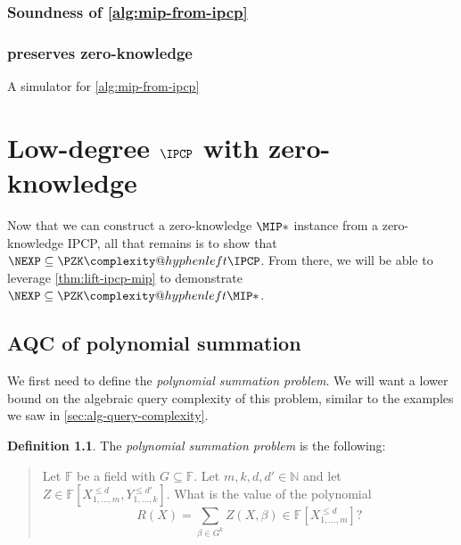 \documentclass[english,12pt]{reedthesis}
\makeatletter
\theoremstyle{plain}
\theoremstyle{definition}
\newtheorem{defn}[defn]{Definition}
\theoremstyle{remark}
\newcommand{\PZKIPCP}{%
  \PZK\complexity@hyphenleft\IPCP
}
\newcommand{\PZKMIP}{%
  \PZK\complexity@hyphenleft\MIP
}
\makeatother
\begin{document}
\subsection{Soundness of \cref{alg:mip-from-ipcp}}

\subsection{ preserves zero-knowledge}

\begin{algorithm}[htbp]
  \caption{A simulator for \cref{alg:mip-from-ipcp}~\cite[]{CFGS22}}\label{alg:sim-mip}
\end{algorithm}

\chapter{Low-degree $\IPCP$ with zero-knowledge}\label{chap:ipcp-zero-knowledge}

Now that we can construct a zero-knowledge $\MIP*$ instance from a
zero-knowledge IPCP, all that remains is to show that $\NEXP \subseteq \PZKIPCP$. From
there, we will be able to leverage \cref{thm:lift-ipcp-mip} to demonstrate
$\NEXP \subseteq \PZKMIP*$.

\section{AQC of polynomial summation}\label{sec:aqc-poly-sum}

We first need to define the \emph{polynomial summation problem}. We will want a
lower bound on the algebraic query complexity of this problem, similar to the
examples we saw in \cref{sec:alg-query-complexity}.

\begin{defn}\label{def:poly-sum}
  The \emph{polynomial summation problem} is the following:
  \begin{quote}
    Let $\mathbb{F}$ be a field with $G \subseteq \mathbb{F}$. Let $m, k, d, d' \in \mathbb{N}$ and
    let $Z \in \mathbb{F}[X_{1, \ldots, m}^{\le d}, Y_{1, \ldots, k}^{\le d'}]$.
    What is the value of the polynomial
    \[
      R(X) = \sum_{\beta \in G^{k}}Z(X, \beta) \in \mathbb{F}[X_{1, \ldots, m}^{\le d}]?
    \]
  \end{quote}
\end{defn}
\end{document}
